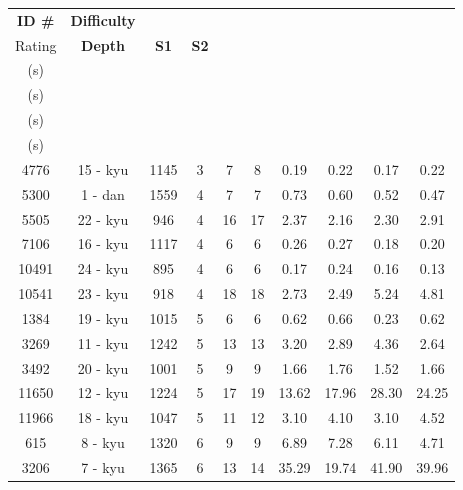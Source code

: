 \documentclass{l4proj}
\begin{document}
\begin{appendices}
\begin{longtable}{|c|c|c|c|c|c|c|c|c|c|}
\hline
\textbf{ID \#} & \textbf{Difficulty} & \textbf{\begin{tabular}[c]{@{}c@{}}Difficulty \\ Rating\end{tabular}} & \textbf{Depth} & \textbf{S1} & \textbf{S2} & \textbf{\begin{tabular}[c]{@{}c@{}}T1 \\ (s)\end{tabular}} & \textbf{\begin{tabular}[c]{@{}c@{}}T2 \\ (s)\end{tabular}} & \textbf{\begin{tabular}[c]{@{}c@{}}T3 \\ (s)\end{tabular}} & \textbf{\begin{tabular}[c]{@{}c@{}}T4 \\ (s)\end{tabular}} \\ \hline
\endfirsthead
%
\endhead
%
4776 & 15 - kyu & 1145 & 3 & 7 & 8 & 0.19 & 0.22 & 0.17 & 0.22 \\ \hline
5300 & 1 - dan & 1559 & 4 & 7 & 7 & 0.73 & 0.60 & 0.52 & 0.47 \\ \hline
5505 & 22 - kyu & 946 & 4 & 16 & 17 & 2.37 & 2.16 & 2.30 & 2.91 \\ \hline
7106 & 16 - kyu & 1117 & 4 & 6 & 6 & 0.26 & 0.27 & 0.18 & 0.20 \\ \hline
10491 & 24 - kyu & 895 & 4 & 6 & 6 & 0.17 & 0.24 & 0.16 & 0.13 \\ \hline
10541 & 23 - kyu & 918 & 4 & 18 & 18 & 2.73 & 2.49 & 5.24 & 4.81 \\ \hline
1384 & 19 - kyu & 1015 & 5 & 6 & 6 & 0.62 & 0.66 & 0.23 & 0.62 \\ \hline
3269 & 11 - kyu & 1242 & 5 & 13 & 13 & 3.20 & 2.89 & 4.36 & 2.64 \\ \hline
3492 & 20 - kyu & 1001 & 5 & 9 & 9 & 1.66 & 1.76 & 1.52 & 1.66 \\ \hline
11650 & 12 - kyu & 1224 & 5 & 17 & 19 & 13.62 & 17.96 & 28.30 & 24.25 \\ \hline
11966 & 18 - kyu & 1047 & 5 & 11 & 12 & 3.10 & 4.10 & 3.10 & 4.52 \\ \hline
615 & 8 - kyu & 1320 & 6 & 9 & 9 & 6.89 & 7.28 & 6.11 & 4.71 \\ \hline
3206 & 7 - kyu & 1365 & 6 & 13 & 14 & 35.29 & 19.74 & 41.90 & 39.96 \\ \hline

\end{longtable}
\end{appendices}
\end{document}
